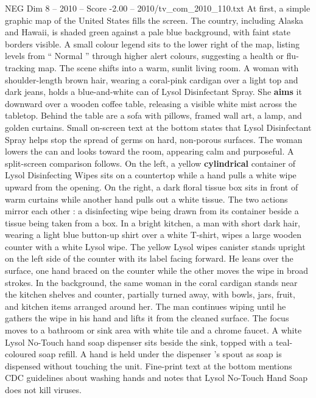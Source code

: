 \begin{textsample}{NEG Dim 8 – 2010 – Score -2.00 – 2010/tv\_com\_2010\_110.txt}  \label{ex:f8_neg_076}
At first, a simple graphic map of the United States fills the screen.
The country, including Alaska and Hawaii, is shaded green against a pale blue background, with faint state borders visible.
A small colour legend sits to the lower right of the map, listing levels from “ Normal ” through higher alert colours, suggesting a health or flu-tracking map.
The scene shifts into a warm, sunlit living room.
A woman with shoulder-length brown hair, wearing a coral-pink cardigan over a light top and dark jeans, holds a blue-and-white can of Lysol Disinfectant Spray.
She \textbf{aims} it downward over a wooden coffee table, releasing a visible white mist across the tabletop.
Behind the table are a sofa with pillows, framed wall art, a lamp, and golden curtains.
Small on-screen text at the bottom states that Lysol Disinfectant Spray helps stop the spread of germs on hard, non-porous surfaces.
The woman lowers the can and looks toward the room, appearing calm and purposeful.
A split-screen comparison follows.
On the left, a yellow \textbf{cylindrical} container of Lysol Disinfecting Wipes sits on a countertop while a hand pulls a white wipe upward from the opening.
On the right, a dark floral tissue box sits in front of warm curtains while another hand pulls out a white tissue.
The two actions mirror each other : a disinfecting wipe being drawn from its container beside a tissue being taken from a box.
In a bright kitchen, a man with short dark hair, wearing a light blue button-up shirt over a white T-shirt, wipes a large wooden counter with a white Lysol wipe.
The yellow Lysol wipes canister stands upright on the left side of the counter with its label facing forward.
He leans over the surface, one hand braced on the counter while the other moves the wipe in broad strokes.
In the background, the same woman in the coral cardigan stands near the kitchen shelves and counter, partially turned away, with bowls, jars, fruit, and kitchen items arranged around her.
The man continues wiping until he gathers the wipe in his hand and lifts it from the cleaned surface.
The focus moves to a bathroom or sink area with white tile and a chrome faucet.
A white Lysol No-Touch hand soap dispenser sits beside the sink, topped with a teal-coloured soap refill.
A hand is held under the dispenser ’s spout as soap is dispensed without touching the unit.
Fine-print text at the bottom mentions CDC guidelines about washing hands and notes that Lysol No-Touch Hand Soap does not kill viruses.

\end{textsample}
